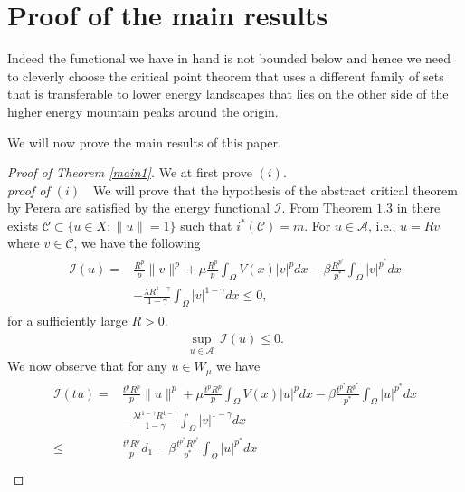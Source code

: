 \documentclass[12pt]{extarticle}
\newtheorem{theorem}{Theorem}[section]
\theoremstyle{definition}
\theoremstyle{remark}
\theoremstyle{definition}
\numberwithin{equation}{section}
\numberwithin{equation}{section}
\begin{document}
		\section{Proof of the main results}
	Indeed the functional we have in hand is not bounded below and hence we need to cleverly choose the critical point theorem that uses a different family of sets that is transferable to lower energy landscapes that lies on the other side of the higher energy mountain peaks around the origin. 
	
	\noindent We will now prove the main results of this paper.
%		
%		
		
	\begin{proof}[Proof of Theorem \ref{main1}]
We at first prove $(i)$.\\
	{\it proof of $(i)$}~~We will prove that the hypothesis of the abstract critical theorem by Perera \cite[Theorem $2.1$]{perera2} are satisfied by the energy functional $\mathcal{I}$. From Theorem $1.3$ in \cite{perera3} there exists $\mathcal{C}\subset \{u\in X:\|u\|=1\}$ such that $i^*(\mathcal{C})=m$. For $u\in\mathcal{A}$, i.e., $u=Rv$ where $v\in \mathcal{C}$, we have the following
	\begin{align}\label{eq2}
		\begin{split}
			\mathcal{I}(u)=&\frac{R^p}{p}\|v\|^p+\mu\frac{R^p}{p}\int_{\Omega}V(x)|v|^pdx-\beta\frac{R^{p^*}}{p^*}\int_{\Omega}|v|^{p^*}dx\\
			&-\frac{\lambda R^{1-\gamma}}{1-\gamma}\int_{\Omega}|v|^{1-\gamma}dx\leq 0,
		\end{split}
	\end{align}
	for a sufficiently large $R>0$. \begin{align}\label{hyp1}\underset{u\in\mathcal{A}}\sup~\mathcal{I}(u)\leq 0.\end{align}
	We now observe that for any $u\in W_{\mu}$ we have
	\begin{align}\label{eq1}
	\begin{split}
	\mathcal{I}(tu)=&\frac{t^pR^p}{p}\|u\|^p+\mu\frac{t^pR^p}{p}\int_{\Omega}V(x)|u|^pdx-\beta\frac{t^{p^*}R^{p^*}}{p^*}\int_{\Omega}|u|^{p^*}dx\\
	&-\frac{\lambda t^{1-\gamma}R^{1-\gamma}}{1-\gamma}\int_{\Omega}|v|^{1-\gamma}dx\\
	\leq & \frac{t^pR^p}{p}d_1-\beta\frac{t^{p^*}R^{p^*}}{p^*}\int_{\Omega}|u|^{p^*}dx\\

\end{split}
\end{align}
\end{proof}
\end{document}
